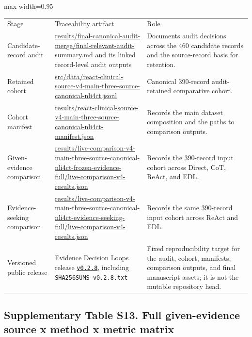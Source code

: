 \documentclass[
  8pt,
]{extarticle}
\begin{document}
\begin{center}
\begin{adjustbox}{max width=0.95\textwidth}
\begin{tabular}{@{}
lll@{}}
\toprule\noalign{}
Stage & Traceability artifact & Role \\

Candidate-record audit &
\url{results/final-canonical-audit-merge/final-relevant-audit-summary.md}
and its linked record-level audit outputs & Documents audit decisions
across the 460 candidate records and the source-record basis for
retention. \\
Retained cohort &
\url{src/data/react-clinical-source-v4-main-three-source-canonical-nli4ct.jsonl}
& Canonical 390-record audit-retained comparative cohort. \\
Cohort manifest &
\url{results/react-clinical-source-v4-main-three-source-canonical-nli4ct-manifest.json}
& Records the main dataset composition and the paths to comparison
outputs. \\
Given-evidence comparison &
\url{results/live-comparison-v4-main-three-source-canonical-nli4ct-frozen-evidence-full/live-comparison-v4-results.json}
& Records the 390-record input cohort across Direct, CoT, ReAct, and
EDL. \\
Evidence-seeking comparison &
\url{results/live-comparison-v4-main-three-source-canonical-nli4ct-evidence-seeking-full/live-comparison-v4-results.json}
& Records the same 390-record input cohort across ReAct and EDL. \\
Versioned public release & Evidence Decision Loops release
\href{https://github.com/xiaoxubeii/evidence-decision-loops/releases/tag/v0.2.8}{\texttt{v0.2.8}},
including \texttt{SHA256SUMS-v0.2.8.txt} & Fixed reproducibility target
for the audit, cohort, manifests, comparison outputs, and final
manuscript assets; it is not the mutable repository head. \\
\bottomrule
\end{tabular}
\end{adjustbox}
\end{center}

\hypertarget{supplementary-table-s13-full-given-evidence-source-x-method-x-metric-matrix}{%
\subsection{Supplementary Table S13. Full given-evidence source x method
x metric
matrix}\label{supplementary-table-s13-full-given-evidence-source-x-method-x-metric-matrix}}
\end{document}
